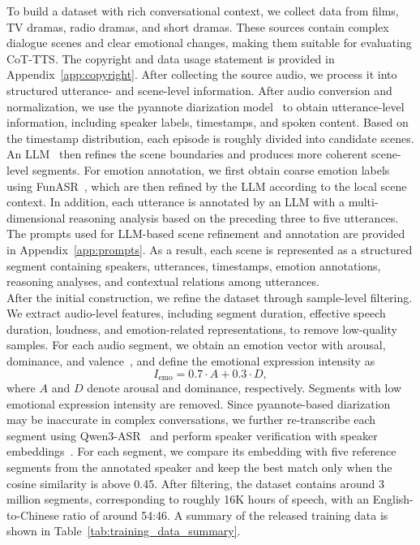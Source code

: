 \documentclass[a4paper]{article}
\begin{document}
\noindent To build a dataset with rich conversational context, we collect data from films, TV dramas, radio dramas, and short dramas. These sources contain complex dialogue scenes and clear emotional changes, making them suitable for evaluating CoT-TTS. The copyright and data usage statement is provided in Appendix~\ref{app:copyright}. After collecting the source audio, we process it into structured utterance- and scene-level information. After audio conversion and normalization, we use the pyannote diarization model~\cite{Bredin23,Plaquet23} to obtain utterance-level information, including speaker labels, timestamps, and spoken content. Based on the timestamp distribution, each episode is roughly divided into candidate scenes. An LLM~\cite{deepseekai2025deepseekr1incentivizingreasoningcapability} then refines the scene boundaries and produces more coherent scene-level segments. For emotion annotation, we first obtain coarse emotion labels using FunASR~\cite{gao2023funasr}, which are then refined by the LLM according to the local scene context. In addition, each utterance is annotated by an LLM with a multi-dimensional reasoning analysis based on the preceding three to five utterances. The prompts used for LLM-based scene refinement and annotation are provided in Appendix~\ref{app:prompts}. As a result, each scene is represented as a structured segment containing speakers, utterances, timestamps, emotion annotations, reasoning analyses, and contextual relations among utterances.\\

\noindent After the initial construction, we refine the dataset through sample-level filtering. We extract audio-level features, including segment duration, effective speech duration, loudness, and emotion-related representations, to remove low-quality samples. For each audio segment, we obtain an emotion vector with arousal, dominance, and valence~\cite{wagner2023dawn}, and define the emotional expression intensity as
\begin{equation}
I_{\mathrm{emo}} = 0.7 \cdot A + 0.3 \cdot D,
\end{equation}
where $A$ and $D$ denote arousal and dominance, respectively. Segments with low emotional expression intensity are removed. Since pyannote-based diarization~\cite{Bredin23,Plaquet23} may be inaccurate in complex conversations, we further re-transcribe each segment using Qwen3-ASR~\cite{Qwen3-ASR} and perform speaker verification with speaker embeddings~\cite{zeinali2019rvector,wang2023wespeaker}. For each segment, we compare its embedding with five reference segments from the annotated speaker and keep the best match only when the cosine similarity is above 0.45. After filtering, the dataset contains around 3 million segments, corresponding to roughly 16K hours of speech, with an English-to-Chinese ratio of around 54:46. A summary of the released training data is shown in Table~\ref{tab:training_data_summary}.\\
\end{document}
